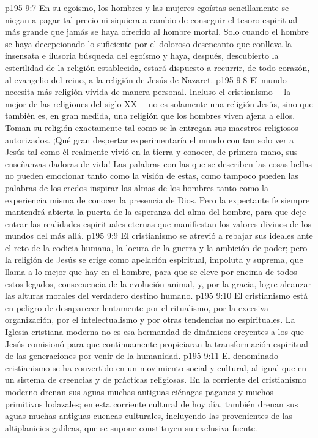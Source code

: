 \vs p195 9:7 En su egoísmo, los hombres y las mujeres egoístas sencillamente se niegan a pagar tal precio ni siquiera a cambio de conseguir el tesoro espiritual más grande que jamás se haya ofrecido al hombre mortal. Solo cuando el hombre se haya decepcionado lo suficiente por el doloroso desencanto que conlleva la insensata e ilusoria búsqueda del egoísmo y haya, después, descubierto la esterilidad de la religión establecida, estará dispuesto a recurrir, de todo corazón, al evangelio del reino, a la religión de Jesús de Nazaret.
\vs p195 9:8 El mundo necesita más religión vivida de manera personal. Incluso el cristianismo ---la mejor de las religiones del siglo XX--- no es solamente una religión  Jesús, sino que también es, en gran medida, una religión que los hombres viven ajena a ellos. Toman su religión exactamente tal como se la entregan sus maestros religiosos autorizados. ¡Qué gran despertar experimentaría el mundo con tan solo ver a Jesús tal como él realmente vivió en la tierra y conocer, de primera mano, sus enseñanzas dadoras de vida! Las palabras con las que se describen las cosas bellas no pueden emocionar tanto como la visión de estas, como tampoco pueden las palabras de los credos inspirar las almas de los hombres tanto como la experiencia misma de conocer la presencia de Dios. Pero la expectante fe siempre mantendrá abierta la puerta de la esperanza del alma del hombre, para que deje entrar las realidades espirituales eternas que manifiestan los valores divinos de los mundos del más allá.
\vs p195 9:9 \pc El cristianismo se atrevió a rebajar sus ideales ante el reto de la codicia humana, la locura de la guerra y la ambición de poder; pero la religión de Jesús se erige como apelación espiritual, impoluta y suprema, que llama a lo mejor que hay en el hombre, para que se eleve por encima de todos estos legados, consecuencia de la evolución animal, y, por la gracia, logre alcanzar las alturas morales del verdadero destino humano.
\vs p195 9:10 El cristianismo está en peligro de desaparecer lentamente por el ritualismo, por la excesiva organización, por el intelectualismo y por otras tendencias no espirituales. La Iglesia cristiana moderna no es esa hermandad de dinámicos creyentes a los que Jesús comisionó para que continuamente propiciaran la transformación espiritual de las generaciones por venir de la humanidad.
\vs p195 9:11 El denominado cristianismo se ha convertido en un movimiento social y cultural, al igual que en un sistema de creencias y de prácticas religiosas. En la corriente del cristianismo moderno drenan sus aguas muchas antiguas ciénagas paganas y muchos primitivos lodazales; en esta corriente cultural de hoy día, también drenan sus aguas muchas antiguas cuencas culturales, incluyendo las provenientes de las altiplanicies galileas, que se supone constituyen su exclusiva fuente.
